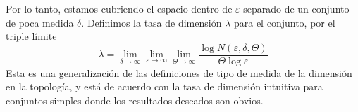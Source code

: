 \begin{appendices}
Por lo tanto, estamos cubriendo el espacio dentro de $\varepsilon$
separado de un conjunto de poca medida $\delta$. Definimos la tasa de
dimensi\'on $\lambda$ para el conjunto, por el triple l\'imite
\begin{equation} 
\lambda = 
\lim_{\delta \to \infty} 
\lim_{\varepsilon \to \infty} 
\lim_{\Theta \to \infty} 
\frac{\log N(\varepsilon, \delta, \Theta)}{\Theta \log \varepsilon} 
\end{equation} 
Esta es una generalizaci\'on de las definiciones de tipo de medida de
la dimensi\'on en la topolog\'ia, y est\'a de acuerdo con la tasa de
dimensi\'on intuitiva para conjuntos simples donde los resultados
deseados son obvios.

\end{appendices}
